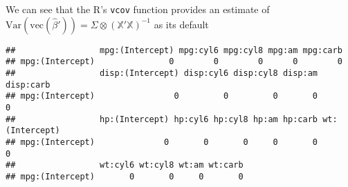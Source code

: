 \documentclass[
  ignorenonframetext,
]{beamer}
\newenvironment{Shaded}{\begin{snugshade}}{\end{snugshade}}
\newcommand{\DecValTok}[1]{\textcolor[rgb]{0.00,0.00,0.81}{#1}}
\newcommand{\FunctionTok}[1]{\textcolor[rgb]{0.00,0.00,0.00}{#1}}
\newcommand{\NormalTok}[1]{#1}
\newcommand{\OtherTok}[1]{\textcolor[rgb]{0.56,0.35,0.01}{#1}}
\newcommand{\SpecialCharTok}[1]{\textcolor[rgb]{0.00,0.00,0.00}{#1}}
\begin{document}
\begin{frame}[fragile]{}
\protect\hypertarget{section-2}{}
We can see that the R's \texttt{vcov} function provides an estimate of
\(\mathrm{Var}(\text{vec}(\hat\beta')) = \Sigma \otimes (\mathbb{X}'\mathbb{X})^{-1}\)
as its default

\vspace{12pt}
\tiny

\begin{Shaded}
\end{Shaded}

\begin{verbatim}
##                 mpg:(Intercept) mpg:cyl6 mpg:cyl8 mpg:am mpg:carb
## mpg:(Intercept)               0        0        0      0        0
##                 disp:(Intercept) disp:cyl6 disp:cyl8 disp:am disp:carb
## mpg:(Intercept)                0         0         0       0         0
##                 hp:(Intercept) hp:cyl6 hp:cyl8 hp:am hp:carb wt:(Intercept)
## mpg:(Intercept)              0       0       0     0       0              0
##                 wt:cyl6 wt:cyl8 wt:am wt:carb
## mpg:(Intercept)       0       0     0       0
\end{verbatim}
\end{frame}
\end{document}

